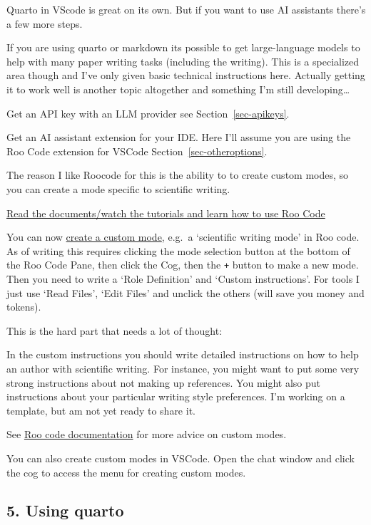 \documentclass[
  letterpaper,
  DIV=11,
  numbers=noendperiod]{scrreprt}
\begin{document}
Quarto in VScode is great on its own. But if you want to use AI
assistants there's a few more steps.

If you are using quarto or markdown its possible to get large-language
models to help with many paper writing tasks (including the writing).
This is a specialized area though and I've only given basic technical
instructions here. Actually getting it to work well is another topic
altogether and something I'm still developing\ldots{}

Get an API key with an LLM provider see Section~\ref{sec-apikeys}.

Get an AI assistant extension for your IDE. Here I'll assume you are
using the Roo Code extension for VSCode Section~\ref{sec-otheroptions}.

The reason I like Roocode for this is the ability to to create custom
modes, so you can create a mode specific to scientific writing.

\href{https://docs.roocode.com/}{Read the documents/watch the tutorials
and learn how to use Roo Code}

You can now \href{https://docs.roocode.com/features/custom-modes}{create
a custom mode}, e.g.~a `scientific writing mode' in Roo code. As of
writing this requires clicking the mode selection button at the bottom
of the Roo Code Pane, then click the Cog, then the \texttt{+} button to
make a new mode. Then you need to write a `Role Definition' and `Custom
instructions'. For tools I just use `Read Files', `Edit Files' and
unclick the others (will save you money and tokens).

This is the hard part that needs a lot of thought:

In the custom instructions you should write detailed instructions on how
to help an author with scientific writing. For instance, you might want
to put some very strong instructions about not making up references. You
might also put instructions about your particular writing style
preferences. I'm working on a template, but am not yet ready to share
it.

See \href{https://docs.roocode.com/features/custom-modes}{Roo code
documentation} for more advice on custom modes.

You can also create custom modes in VSCode. Open the chat window and
click the cog to access the menu for creating custom modes.

\subsection{5. Using quarto}\label{using-quarto}
\end{document}
